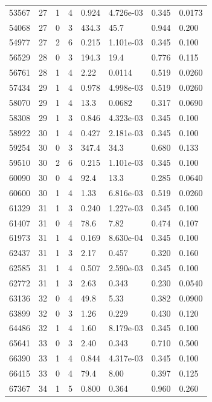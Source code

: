 \documentclass[preview]{standalone}
\begin{document}
{{{{\begin{tabular}{L{1.2cm}C{1.2cm} C{0.3cm}C{0.5cm} C{1.4cm}C{1.4cm} C{1.4cm}C{1.4cm}}
  53567  &    27  & 1     &  4 &  0.924  & 4.726e-03  & 0.345 &  0.0173   \\ 
  54068  &    27  & 0     &  3 &  434.3  & 45.7  & 0.944 &  0.200   \\ 
  54977  &    27  & 2     &  6 &  0.215  & 1.101e-03  & 0.345 &  0.100   \\ 
  56529  &    28  & 0     &  3 &  194.3  & 19.4  & 0.776 &  0.115   \\ 
  56761  &    28  & 1     &  4 &  2.22  & 0.0114  & 0.519 &  0.0260   \\ 
  57434  &    29  & 1     &  4 &  0.978  & 4.998e-03  & 0.519 &  0.0260   \\ 
  58070  &    29  & 1     &  4 &  13.3  & 0.0682  & 0.317 &  0.0690   \\ 
  58308  &    29  & 1     &  3 &  0.846  & 4.323e-03  & 0.345 &  0.100   \\ 
  58922  &    30  & 1     &  4 &  0.427  & 2.181e-03  & 0.345 &  0.100   \\ 
  59254  &    30  & 0     &  3 &  347.4  & 34.3  & 0.680 &  0.133   \\ 
  59510  &    30  & 2     &  6 &  0.215  & 1.101e-03  & 0.345 &  0.100   \\ 
  60090  &    30  & 0     &  4 &  92.4  & 13.3  & 0.285 &  0.0640   \\ 
  60600  &    30  & 1     &  4 &  1.33  & 6.816e-03  & 0.519 &  0.0260   \\ 
  61329  &    31  & 1     &  3 &  0.240  & 1.227e-03  & 0.345 &  0.100   \\ 
  61407  &    31  & 0     &  4 &  78.6  & 7.82  & 0.474 &  0.107   \\ 
  61973  &    31  & 1     &  4 &  0.169  & 8.630e-04  & 0.345 &  0.100   \\ 
  62437  &    31  & 1     &  3 &  2.17  & 0.457  & 0.320 &  0.160   \\ 
  62585  &    31  & 1     &  4 &  0.507  & 2.590e-03  & 0.345 &  0.100   \\ 
  62772  &    31  & 1     &  3 &  2.63  & 0.343  & 0.230 &  0.0540   \\ 
  63136  &    32  & 0     &  4 &  49.8  & 5.33  & 0.382 &  0.0900   \\ 
  63899  &    32  & 0     &  3 &  1.26  & 0.229  & 0.430 &  0.120   \\ 
  64486  &    32  & 1     &  4 &  1.60  & 8.179e-03  & 0.345 &  0.100   \\ 
  65641  &    33  & 0     &  3 &  2.40  & 0.343  & 0.710 &  0.500   \\ 
  66390  &    33  & 1     &  4 &  0.844  & 4.317e-03  & 0.345 &  0.100   \\ 
  66415  &    33  & 0     &  4 &  79.4  & 8.00  & 0.397 &  0.125   \\ 
  67367  &    34  & 1     &  5 &  0.800  & 0.364  & 0.960 &  0.260   \\ 
\hline 
\end{tabular} 

}}}}
\end{document}
